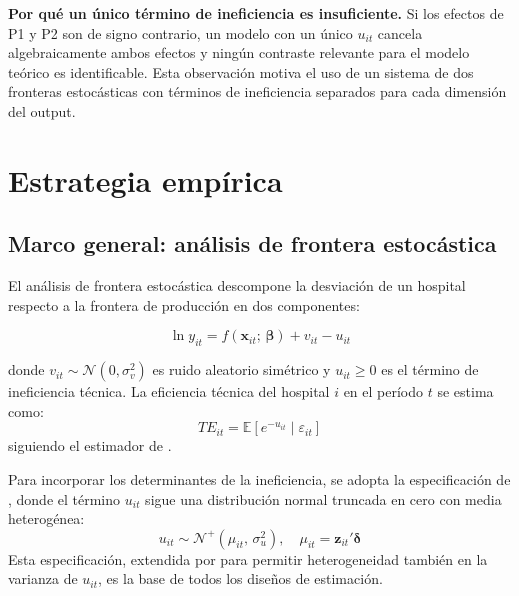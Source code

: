 \documentclass[12pt, a4paper]{article}
\newcommand{\E}{\mathbb{E}}
\newcommand{\N}{\mathcal{N}}
\newcommand{\bsym}[1]{\boldsymbol{#1}}
\begin{document}
\textbf{Por qué un único término de ineficiencia es
insuficiente.} Si los efectos de P1 y P2 son de signo
contrario, un modelo con un único $u_{it}$ cancela
algebraicamente ambos efectos y ningún contraste
relevante para el modelo teórico es identificable. Esta
observación motiva el uso de un sistema de dos fronteras
estocásticas con términos de ineficiencia separados para
cada dimensión del output.

\section{Estrategia empírica}

\subsection{Marco general: análisis de frontera estocástica}

El análisis de frontera estocástica \citep{aigner1977,
meeusen1977} descompone la desviación de un hospital
respecto a la frontera de producción en dos componentes:

\begin{equation}
  \ln y_{it} = f(\mathbf{x}_{it};\,\bsym{\beta})
               + v_{it} - u_{it}
  \label{eq:sfa_base}
\end{equation}

donde $v_{it} \sim \N(0, \sigma^2_v)$ es ruido
aleatorio simétrico y $u_{it} \geq 0$ es el término de
ineficiencia técnica. La eficiencia técnica del hospital
$i$ en el período $t$ se estima como:
\begin{equation}
  TE_{it} = \E\!\left[e^{-u_{it}} \mid \varepsilon_{it}
  \right]
  \label{eq:te}
\end{equation}
siguiendo el estimador de \citet{jondrow1982}.

Para incorporar los determinantes de la ineficiencia,
se adopta la especificación de \citet{battese1995}, donde
el término $u_{it}$ sigue una distribución normal truncada
en cero con media heterogénea:
\begin{equation}
  u_{it} \sim \N^+\!\left(\mu_{it},\, \sigma^2_u\right),
  \quad
  \mu_{it} = \mathbf{z}_{it}'\bsym{\delta}
  \label{eq:bc95}
\end{equation}
Esta especificación, extendida por \citet{wang2002} para
permitir heterogeneidad también en la varianza de
$u_{it}$, es la base de todos los diseños de estimación.
\end{document}
